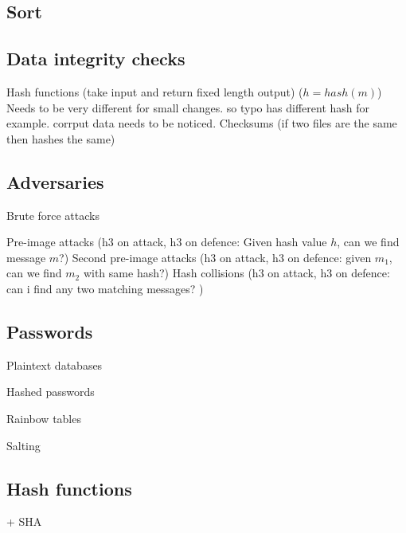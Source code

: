 \subsection{Sort}


\subsection{Data integrity checks}

Hash functions (take input and return fixed length output) (\(h=hash(m)\))
Needs to be very different for small changes. so typo has different hash for example. corrput data needs to be noticed.
Checksums (if two files are the same then hashes the same)

\subsection{Adversaries}

Brute force attacks

Pre-image attacks (h3 on attack, h3 on defence: Given hash value \(h\), can we find message \(m\)?)
Second pre-image attacks (h3 on attack, h3 on defence: given \(m_1\), can we find \(m_2\) with same hash?)
Hash collisions (h3 on attack, h3 on defence: can i find any two matching messages? )

\subsection{Passwords}

Plaintext databases

Hashed passwords

Rainbow tables

Salting

\subsection{Hash functions}
+ SHA

